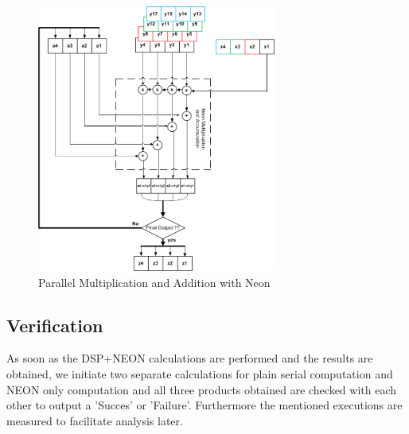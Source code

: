 \begin{figure}[h]
\centering 
\includegraphics[width= 0.7\textwidth]{images/MandA}
\caption{Parallel Multiplication and Addition with Neon  }
\label{fig:neon_mult_add}
\end{figure}

\subsection{Verification}
As soon as the DSP+NEON calculations are performed and the results are obtained, we initiate two separate calculations for plain serial computation and NEON only computation and all three products obtained are checked with each other to output a 'Succes' or 'Failure'. Furthermore the mentioned executions are measured to facilitate analysis later.